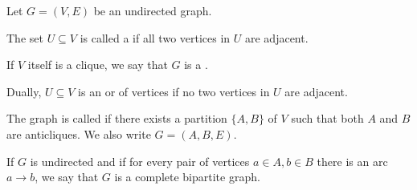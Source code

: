 \begin{definition}\label{def:graph_adjacency}
  Let \( G = (V, E) \) be an undirected graph.

  \begin{thmenum}
    The set \( U \subseteq V \) is called a  if all two vertices in \( U \) are adjacent.

    \medskip

    If \( V \) itself is a clique, we say that \( G \) is a .

    \medskip

    Dually, \( U \subseteq V \) is an  or  of vertices if no two vertices in \( U \) are adjacent.

    The graph is called  if there exists a partition \( \{ A, B \} \) of \( V \) such that both \( A \) and \( B \) are anticliques. We also write \( G = (A, B, E) \).

    If \( G \) is undirected and if for every pair of vertices \( a \in A, b \in B \) there is an arc \( a \to b \), we say that \( G \) is a complete bipartite graph.
  \end{thmenum}
\end{definition}

